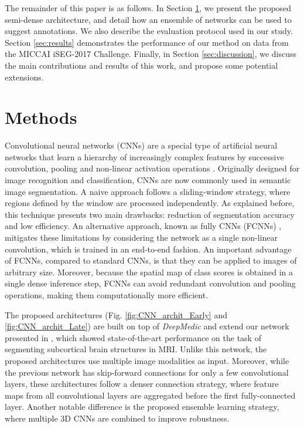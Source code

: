 \documentclass[twoside,espcrc2]{elsarticle}
\begin{document}
The remainder of this paper is as follows. In Section \ref{sec:methods}, we present the proposed semi-dense architecture, and detail how an ensemble of networks can be used to suggest annotations. We also describe the evaluation protocol used in our study. Section \ref{sec:results} demonstrates the performance of our method on data from the MICCAI iSEG-2017 Challenge. Finally, in Section \ref{sec:discussion}, we discuss the main contributions and results of this work, and propose some potential extensions.









\section{Methods}\label{sec:methods}



Convolutional neural networks (CNNs) are a special type of artificial neural networks that learn a hierarchy of increasingly complex features by successive convolution, pooling and non-linear activation operations \cite{lecun1998gradient,krizhevsky2012imagenet}. Originally designed for image recognition and classification, CNNs are now commonly used in semantic image segmentation. A naive approach follows a sliding-window strategy, where regions defined by the window are processed independently. As explained before, this technique presents two main drawbacks: reduction of segmentation accuracy and low efficiency. An alternative approach, known as fully CNNs (FCNNs) \cite{long2015fully}, mitigates these limitations by considering the network as a single non-linear convolution, which is trained in an end-to-end fashion. An important advantage of FCNNs, compared to standard CNNs, is that they can be applied to images of arbitrary size. Moreover, because the spatial map of class scores is obtained in a single dense inference step, FCNNs can avoid redundant convolution and pooling operations, making them computationally more efficient. 




The proposed architectures (Fig. \ref{fig:CNN_archit_Early} and \ref{fig:CNN_archit_Late}) are built on top of \textit{DeepMedic} \cite{kamnitsas2017efficient} and 
extend our network presented in \cite{DolzNeuro2017}, which showed state-of-the-art performance on the task of segmenting subcortical brain structures in MRI. Unlike this network, the proposed architectures use multiple image modalities as input. Moreover, while the previous network has skip-forward connections for only a few convolutional layers, these architectures follow a denser connection strategy, where feature maps from all convolutional layers are aggregated before the first fully-connected layer. Another notable difference is the proposed ensemble learning strategy, where multiple 3D CNNs are combined to improve robustness.
\end{document}
